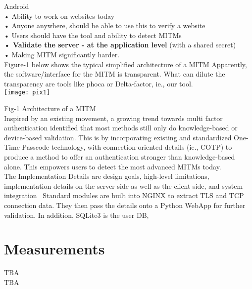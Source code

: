 \documentclass[a4paper, 11pt]{article} 				%
\begin{document}
Android\\
• Ability to work on websites today\\
• Anyone anywhere, should be able to use this to verify a website\\
• Users should have the tool and ability to detect MITMs\\
\textbf{• Validate the server - at the application level} (with a shared secret)\\
• Making MITM significantly harder.\\

\noindent
Figure-1 below shows the typical simplified architecture of a MITM 
Apparently, the software/interface for the MITM is transparent. What can dilute the transparency are tools like phoca or Delta-factor, ie., our tool.\\

\texttt{[image: pix1]}
  
Fig-1 Architecture of a MITM\\ 

\noindent Inspired by an existing movement, a growing trend towards multi factor authentication
identified that most methods still only do knowledge-based or device-based validation.
This is by incorporating existing and standardized One-Time Passcode technology, with connection-oriented details (ie., COTP)
to produce a method to offer an authentication stronger than knowledge-based alone. This empowers users to detect the most advanced MITMs today.\\

\noindent
The Implementation Details are design goals, high-level limitations, implementation details on the server side as well as the client side, and system integration\
\noindent
Standard modules are built into NGINX to extract TLS and TCP connection data. They then pass the details onto a Python WebApp for further validation. In addition, SQLite3 is the user DB,\\



\section{Measurements}
TBA\\
TBA\\
\end{document}
